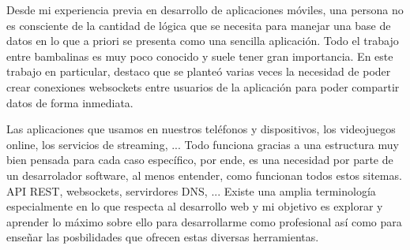 Desde mi experiencia previa en desarrollo de aplicaciones móviles, una persona no es consciente de la cantidad de lógica que se necesita para manejar una base
de datos en lo que a priori se presenta como una sencilla aplicación. Todo el trabajo entre bambalinas es muy poco conocido y suele tener gran importancia. En este trabajo en particular,
destaco que se planteó varias veces la necesidad de poder crear conexiones websockets entre usuarios de la aplicación para poder compartir datos de forma inmediata.

Las aplicaciones que usamos en nuestros teléfonos y dispositivos, los videojuegos online, los servicios de streaming, ... Todo funciona gracias a una estructura muy bien pensada para cada caso
específico, por ende, es una necesidad por parte de un desarrolador software, al menos entender, como funcionan todos estos sitemas. API REST, websockets, servirdores DNS, ... Existe una amplia terminología
especialmente en lo que respecta al desarrollo web y mi objetivo es explorar y aprender lo máximo sobre ello para desarrollarme como profesional así como para enseñar las posbilidades que ofrecen estas diversas herramientas.
